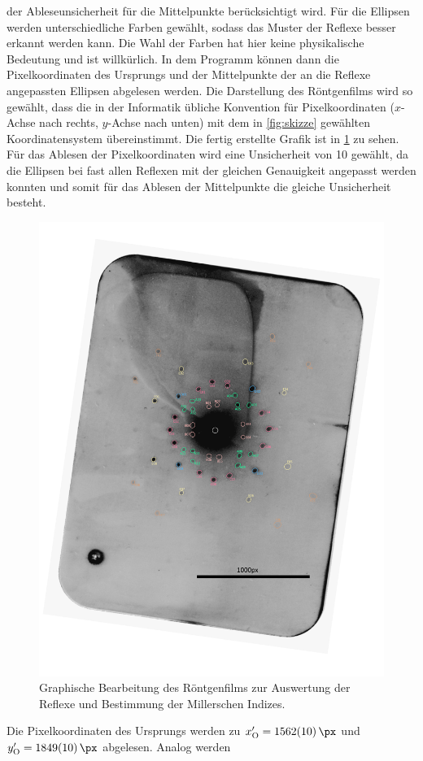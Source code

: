 der Ableseunsicherheit für die Mittelpunkte berücksichtigt wird. Für die Ellipsen werden unterschiedliche Farben gewählt, sodass das Muster der Reflexe
besser erkannt werden kann. Die Wahl der Farben hat hier keine physikalische Bedeutung und ist willkürlich. In dem Programm können dann die Pixelkoordinaten
des Ursprungs und der Mittelpunkte der an die Reflexe angepassten Ellipsen abgelesen werden. Die Darstellung des Röntgenfilms wird so gewählt, dass die in der
Informatik übliche Konvention für Pixelkoordinaten ($x$-Achse nach rechts, $y$-Achse nach unten) mit dem in \cref{fig:skizze} gewählten Koordinatensystem übereinstimmt.
Die fertig erstellte Grafik ist in \cref{fig:reflexe} zu sehen. Für das Ablesen der Pixelkoordinaten wird eine Unsicherheit von \SI{10}{\px} gewählt, da die Ellipsen
bei fast allen Reflexen mit der gleichen Genauigkeit angepasst werden konnten und somit für das Ablesen der Mittelpunkte die gleiche Unsicherheit besteht.
\begin{figure}[H]
	\centering
	\includegraphics[width=0.9\linewidth]{../figs/reflexe.png}
	\caption{Graphische Bearbeitung des Röntgenfilms zur Auswertung der Reflexe und Bestimmung der Millerschen Indizes.}
	\label{fig:reflexe}
\end{figure} Die Pixelkoordinaten des Ursprungs werden zu $x_{\mathrm{O}}' = \SI{1562(10)}{\px}$ und $y_{\mathrm{O}}' = \SI{1849(10)}{\px}$ abgelesen. Analog werden
